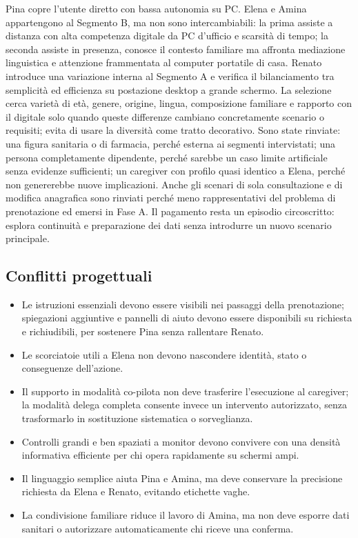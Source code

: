 Pina copre l'utente diretto con bassa autonomia su PC. Elena e Amina appartengono al Segmento B, ma non sono intercambiabili: la prima assiste a distanza con alta competenza digitale da PC d'ufficio e scarsità di tempo; la seconda assiste in presenza, conosce il contesto familiare ma affronta mediazione linguistica e attenzione frammentata al computer portatile di casa. Renato introduce una variazione interna al Segmento A e verifica il bilanciamento tra semplicità ed efficienza su postazione desktop a grande schermo. La selezione cerca varietà di età, genere, origine, lingua, composizione familiare e rapporto con il digitale solo quando queste differenze cambiano concretamente scenario o requisiti; evita di usare la diversità come tratto decorativo. Sono state rinviate: una figura sanitaria o di farmacia, perché esterna ai segmenti intervistati; una persona completamente dipendente, perché sarebbe un caso limite artificiale senza evidenze sufficienti; un caregiver con profilo quasi identico a Elena, perché non genererebbe nuove implicazioni. Anche gli scenari di sola consultazione e di modifica anagrafica sono rinviati perché meno rappresentativi del problema di prenotazione ed emersi in Fase A. Il pagamento resta un episodio circoscritto: esplora continuità e preparazione dei dati senza introdurre un nuovo scenario principale.

\subsection{Conflitti progettuali}

\begin{itemize}
\item Le istruzioni essenziali devono essere visibili nei passaggi della prenotazione; spiegazioni aggiuntive e pannelli di aiuto devono essere disponibili su richiesta e richiudibili, per sostenere Pina senza rallentare Renato.
\item Le scorciatoie utili a Elena non devono nascondere identità, stato o conseguenze dell'azione.
\item Il supporto in modalità co-pilota non deve trasferire l'esecuzione al caregiver; la modalità delega completa consente invece un intervento autorizzato, senza trasformarlo in sostituzione sistematica o sorveglianza.
\item Controlli grandi e ben spaziati a monitor devono convivere con una densità informativa efficiente per chi opera rapidamente su schermi ampi.
\item Il linguaggio semplice aiuta Pina e Amina, ma deve conservare la precisione richiesta da Elena e Renato, evitando etichette vaghe.
\item La condivisione familiare riduce il lavoro di Amina, ma non deve esporre dati sanitari o autorizzare automaticamente chi riceve una conferma.
\end{itemize}

